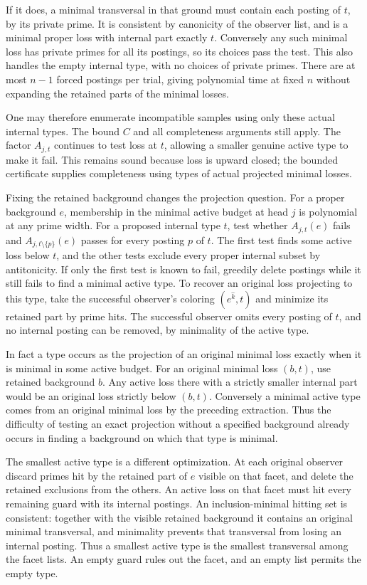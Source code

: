 If it does, a minimal transversal in
that ground must contain each posting
of $t$, by its private prime. It is
consistent by canonicity of the observer
list, and is a minimal proper loss
with internal part exactly $t$.
Conversely any such minimal loss has
private primes for all its postings,
so its choices pass the test. This
also handles the empty internal type,
with no choices of private primes.
There are at most $n-1$ forced postings
per trial, giving polynomial time at
fixed $n$ without expanding the retained
parts of the minimal losses.

One may therefore enumerate incompatible
samples using only these actual internal
types. The bound $C$ and all completeness
arguments still apply. The factor
$A_{j,t}$ continues to test loss at $t$,
allowing a smaller genuine active type
to make it fail. This remains sound
because loss is upward closed; the
bounded certificate supplies completeness
using types of actual projected minimal
losses.

Fixing the retained background changes
the projection question. For a proper
background $e$, membership in the minimal
active budget at head $j$ is polynomial
at any prime width. For a proposed internal
type $t$, test whether $A_{j,t}(e)$ fails
and $A_{j,t\setminus\{p\}}(e)$ passes for
every posting $p$ of $t$. The first test
finds some active loss below $t$, and the
other tests exclude every proper internal
subset by antitonicity. If only the first
test is known to fail, greedily delete
postings while it still fails to find a
minimal active type. To recover an
original loss projecting to this type,
take the successful observer's coloring
$(e^{\widehat k},t)$ and minimize its
retained part by prime hits. The successful
observer omits every posting of $t$, and
no internal posting can be removed, by
minimality of the active type.

In fact a type occurs as the projection
of an original minimal loss exactly when
it is minimal in some active budget.
For an original minimal loss $(b,t)$,
use retained background $b$. Any active
loss there with a strictly smaller internal
part would be an original loss strictly
below $(b,t)$. Conversely a minimal active
type comes from an original minimal loss
by the preceding extraction. Thus the
difficulty of testing an exact projection
without a specified background already
occurs in finding a background on which
that type is minimal.

The smallest active type is a different
optimization. At each original observer
discard primes hit by the retained part of
$e$ visible on that facet, and delete the
retained exclusions from the others.
An active loss on that facet must hit
every remaining guard with its internal
postings. An inclusion-minimal hitting
set is consistent: together with the
visible retained background it contains
an original minimal transversal, and
minimality prevents that transversal
from losing an internal posting.
Thus a smallest active type is the
smallest transversal among the facet
lists. An empty guard rules out the
facet, and an empty list permits the
empty type.

